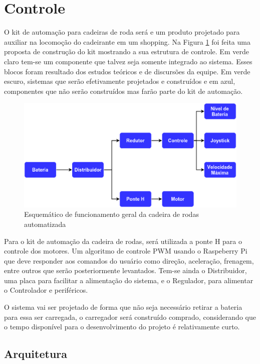 \section{Controle}

O kit de automação para cadeiras de roda será e um produto projetado para auxiliar na locomoção do cadeirante em um shopping. Na Figura \ref{fig:esquema_controle} foi feita uma proposta de construção do kit mostrando a sua estrutura de controle. Em verde claro tem-se um componente que talvez seja somente integrado ao sistema. Esses blocos foram resultado dos estudos teóricos e de discursões da equipe. Em verde escuro, sistemas que serão efetivamente projetados e construídos e em azul, componentes que não serão construídos mas farão parte do kit de automação.

\begin{figure}[!htb]
\centering
  \includegraphics[keepaspectratio=true,scale=0.6]{figuras/resultados/esquema_controle}
\caption{Esquemático de funcionamento geral da cadeira de rodas automatizada}
\label{fig:esquema_controle}
\end{figure}

Para o kit de automação da cadeira de rodas, será utilizada a ponte H para o controle dos motores. Um algoritmo de controle PWM usando o Raspeberry Pi que deve responder aos comandos do usuário como direção, aceleração, frenagem, entre outros que serão posteriormente levantados. Tem-se ainda o Distribuidor, uma placa para facilitar a alimentação do sistema, e o Regulador, para alimentar o Controlador e periféricos.

O sistema vai ser projetado de forma que não seja necessário retirar a bateria para essa ser carregada, o carregador será construído comprado, considerando que o tempo disponível para o desenvolvimento do projeto é relativamente curto.

\subsection{Arquitetura}

